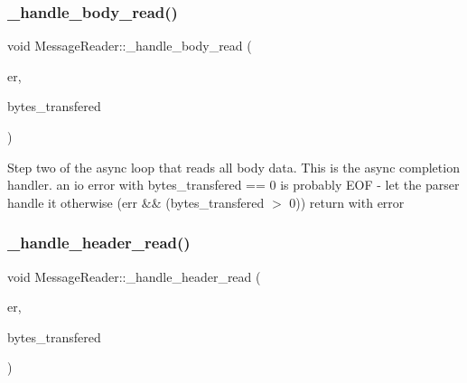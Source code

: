 \subsubsection{\texorpdfstring{\+\_\+handle\+\_\+body\+\_\+read()}{\_handle\_body\_read()}}
{\footnotesize\ttfamily void Message\+Reader\+::\+\_\+handle\+\_\+body\+\_\+read (\begin{DoxyParamCaption}\item[{Marvin\+::\+Error\+Type}]{er,  }\item[{std\+::size\+\_\+t}]{bytes\+\_\+transfered }\end{DoxyParamCaption})\hspace{0.3cm}{\ttfamily [protected]}}

Step two of the async loop that reads all body data. This is the async completion handler. an io error with bytes\+\_\+transfered == 0 is probably E\+OF -\/ let the parser handle it otherwise (err \&\& (bytes\+\_\+transfered $>$ 0)) return with error\mbox{\label{class_message_reader_a545048a118c1d77940886544742dd9c0}} 
\subsubsection{\texorpdfstring{\+\_\+handle\+\_\+header\+\_\+read()}{\_handle\_header\_read()}}
{\footnotesize\ttfamily void Message\+Reader\+::\+\_\+handle\+\_\+header\+\_\+read (\begin{DoxyParamCaption}\item[{Marvin\+::\+Error\+Type}]{er,  }\item[{std\+::size\+\_\+t}]{bytes\+\_\+transfered }\end{DoxyParamCaption})\hspace{0.3cm}{\ttfamily [protected]}}

